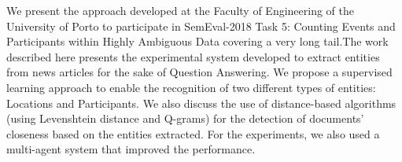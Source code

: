 We present the approach developed at the Faculty of Engineering of the University of Porto to participate in SemEval-2018 Task 5: Counting Events and Participants within Highly Ambiguous Data covering a very long tail.The work described here presents the experimental system developed to extract entities from news articles for the sake of Question Answering. We propose a supervised learning approach to enable the recognition of two different types of entities: Locations and Participants. We also discuss the use of distance-based algorithms (using Levenshtein distance and Q-grams) for the detection of documents' closeness based on the entities extracted. For the experiments, we also used a multi-agent system that improved the performance.
